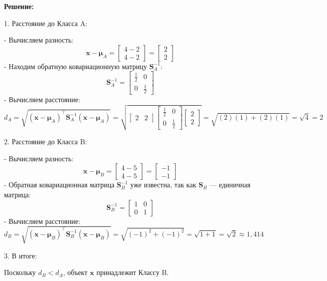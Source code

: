 \textbf{Решение:}

1. Расстояние до Класса A:

- Вычисляем разность:
  \[
  \mathbf{x} - \mathbf{\mu}_A = \begin{bmatrix} 4 - 2 \\ 4 - 2 \end{bmatrix} = \begin{bmatrix} 2 \\ 2 \end{bmatrix}
  \]
- Находим обратную ковариационную матрицу \( \mathbf{S}_A^{-1} \):
  \[
  \mathbf{S}_A^{-1} = \begin{bmatrix} \frac{1}{2} & 0 \\ 0 & \frac{1}{2} \end{bmatrix}
  \]
- Вычисляем расстояние:
  \[
  d_A = \sqrt{ (\mathbf{x} - \mathbf{\mu}_A)^\top \mathbf{S}_A^{-1} (\mathbf{x} - \mathbf{\mu}_A) } = \sqrt{ \begin{bmatrix} 2 & 2 \end{bmatrix} \begin{bmatrix} \frac{1}{2} & 0 \\ 0 & \frac{1}{2} \end{bmatrix} \begin{bmatrix} 2 \\ 2 \end{bmatrix} } = \sqrt{ (2)(1) + (2)(1) } = \sqrt{4} = 2
  \]

2. Расстояние до Класса B:

- Вычисляем разность:
  \[
  \mathbf{x} - \mathbf{\mu}_B = \begin{bmatrix} 4 - 5 \\ 4 - 5 \end{bmatrix} = \begin{bmatrix} -1 \\ -1 \end{bmatrix}
  \]
- Обратная ковариационная матрица \( \mathbf{S}_B^{-1} \) уже известна, так как \( \mathbf{S}_B \) — единичная матрица:
  \[
  \mathbf{S}_B^{-1} = \begin{bmatrix} 1 & 0 \\ 0 & 1 \end{bmatrix}
  \]
- Вычисляем расстояние:
  \[
  d_B = \sqrt{ (\mathbf{x} - \mathbf{\mu}_B)^\top \mathbf{S}_B^{-1} (\mathbf{x} - \mathbf{\mu}_B) } = \sqrt{ (-1)^2 + (-1)^2 } = \sqrt{1 + 1} = \sqrt{2} \approx 1{,}414
  \]

3. В итоге:

Поскольку \( d_B < d_A \), объект \( \mathbf{x} \) принадлежит Классу B.



